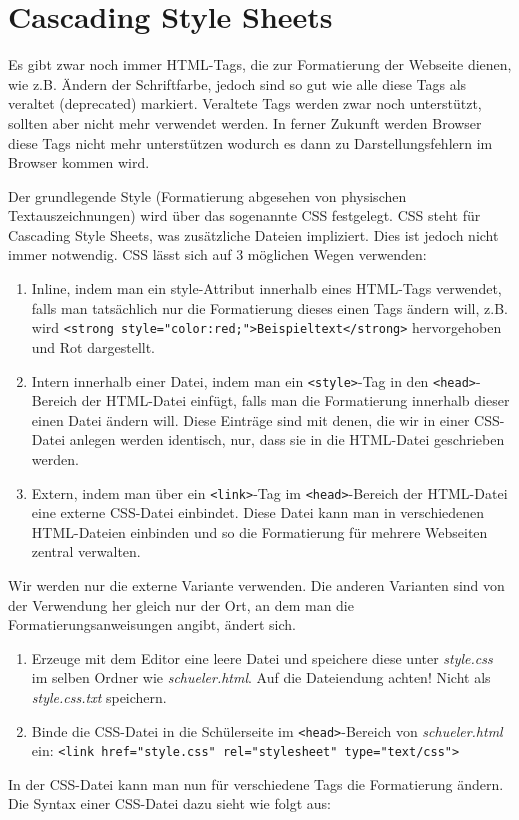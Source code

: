 \section{Cascading Style Sheets}
Es gibt zwar noch immer HTML-Tags, die zur Formatierung der Webseite dienen, wie z.B. Ändern der Schriftfarbe, jedoch sind so gut wie alle diese Tags als veraltet (deprecated) markiert. Veraltete Tags werden zwar noch unterstützt, sollten aber nicht mehr verwendet werden. In ferner Zukunft werden Browser diese Tags nicht mehr unterstützen wodurch es dann zu Darstellungsfehlern im Browser kommen wird.

Der grundlegende Style (Formatierung abgesehen von physischen Textauszeichnungen) wird über das sogenannte CSS festgelegt. CSS steht für Cascading Style Sheets, was zusätzliche Dateien impliziert. Dies ist jedoch nicht immer notwendig. CSS lässt sich auf 3 möglichen Wegen verwenden:
\begin{enumerate}
    \item Inline, indem man ein style-Attribut innerhalb eines HTML-Tags verwendet, falls man tatsächlich nur die Formatierung dieses einen Tags ändern will, z.B. wird \lstinline|<strong style="color:red;">Beispieltext</strong>| hervorgehoben und Rot dargestellt.
    \item Intern innerhalb einer Datei, indem man ein \lstinline|<style>|-Tag in den \lstinline|<head>|-Bereich der HTML-Datei einfügt, falls man die Formatierung innerhalb dieser einen Datei ändern will. Diese Einträge sind mit denen, die wir in einer CSS-Datei anlegen werden identisch, nur, dass sie in die HTML-Datei geschrieben werden.
    \item Extern, indem man über ein  \lstinline|<link>|-Tag im \lstinline|<head>|-Bereich der HTML-Datei eine externe CSS-Datei einbindet. Diese Datei kann man in verschiedenen HTML-Dateien einbinden und so die Formatierung für mehrere Webseiten zentral verwalten.
\end{enumerate}

Wir werden nur die externe Variante verwenden. Die anderen Varianten sind von der Verwendung her gleich nur der Ort, an dem man die Formatierungsanweisungen angibt, ändert sich.

\begin{Exercise}[title=, label=CSS1]
    \begin{enumerate}
        \item Erzeuge mit dem Editor eine leere Datei und speichere diese unter \textit{style.css} im selben Ordner wie \textit{schueler.html}. Auf die Dateiendung achten! Nicht als \textit{style.css.txt} speichern.
        \item Binde die CSS-Datei in die Schülerseite im  \lstinline|<head>|-Bereich von \textit{schueler.html} ein:
        \lstinline|<link href="style.css" rel="stylesheet" type="text/css">|
    \end{enumerate}
\end{Exercise}
In der CSS-Datei kann man nun für verschiedene Tags die Formatierung ändern. Die Syntax einer CSS-Datei dazu sieht wie folgt aus:

